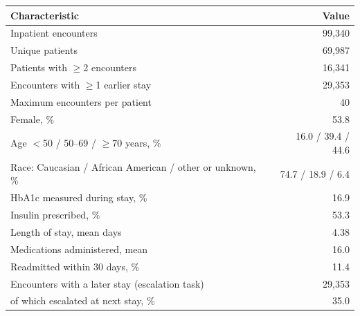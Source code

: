 \begin{tabular}{@{}lr@{}}
\toprule
Characteristic & Value \\
\midrule
Inpatient encounters & 99,340 \\
Unique patients & 69,987 \\
Patients with $\geq$2 encounters & 16,341 \\
Encounters with $\geq$1 earlier stay & 29,353 \\
Maximum encounters per patient & 40 \\
Female, \% & 53.8 \\
Age $<$50 / 50--69 / $\geq$70 years, \% & 16.0 / 39.4 / 44.6 \\
Race: Caucasian / African American / other or unknown, \% & 74.7 / 18.9 / 6.4 \\
HbA1c measured during stay, \% & 16.9 \\
Insulin prescribed, \% & 53.3 \\
Length of stay, mean days & 4.38 \\
Medications administered, mean & 16.0 \\
Readmitted within 30 days, \% & 11.4 \\
Encounters with a later stay (escalation task) & 29,353 \\
\quad of which escalated at next stay, \% & 35.0 \\
\bottomrule
\end{tabular}
